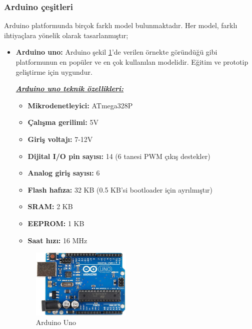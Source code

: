 \subsubsection{Arduino çeşitleri}
    Arduino platformunda birçok farklı model bulunmaktadır. Her model, farklı ihtiyaçlara yönelik olarak tasarlanmıştır;
\begin{itemize}   

\item \textbf{Arduino uno:} Arduino şekil \ref{fig:7}'de verilen örnekte göründüğü gibi platformunun en popüler ve en çok kullanılan modelidir. Eğitim ve prototip geliştirme için uygundur.
\par\textbf{\textit{\underline{Arduino uno teknik özellikleri:}}}

\begin{itemize}
\item \textbf{Mikrodenetleyici:} ATmega328P
\item \textbf{Çalışma gerilimi:} 5V
\item \textbf{Giriş voltajı:} 7-12V
\item \textbf{Dijital I/O pin sayısı:} 14 (6 tanesi PWM çıkış destekler)
\item \textbf{Analog giriş sayısı:} 6
\item \textbf{Flash hafıza:} 32 KB (0.5 KB'si bootloader için ayrılmıştır)
\item \textbf{SRAM:} 2 KB
\item \textbf{EEPROM:} 1 KB
\item \textbf{Saat hızı:} 16 MHz
\end{itemize}


\begin{figure}[H]
\centering
\includegraphics[width=0.45\textwidth]{Resimler/7.png}
\caption{Arduino Uno}
\label{fig:7}
\end{figure}


\end{itemize}
